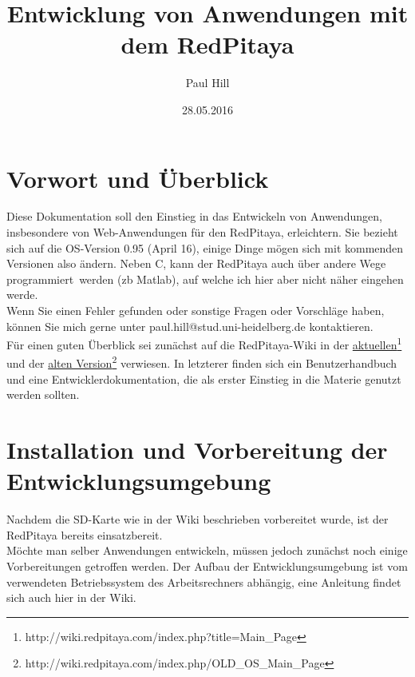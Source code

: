 \documentclass[11pt]{scrartcl}
\begin{document}
\title{Entwicklung von Anwendungen mit dem RedPitaya}
\author{Paul Hill}
\date{28.05.2016}

\maketitle
\tableofcontents
\newpage

\section{Vorwort und Überblick}
Diese Dokumentation soll den Einstieg in das Entwickeln von Anwendungen, insbesondere von Web-Anwendungen für den RedPitaya, erleichtern. Sie bezieht sich auf die OS-Version 0.95 (April 16), einige Dinge mögen sich mit kommenden Versionen also ändern. Neben C, kann der RedPitaya auch über andere Wege \grqq programmiert\grqq~werden (zb Matlab), auf welche ich hier aber nicht näher eingehen werde. \\
Wenn Sie einen Fehler gefunden oder sonstige Fragen oder Vorschläge haben, können Sie mich gerne unter paul.hill@stud.uni-heidelberg.de kontaktieren.\\
 
Für einen guten Überblick sei zunächst auf die RedPitaya-Wiki in der \href{http://wiki.redpitaya.com/index.php?title=Main_Page}{aktuellen\footnote{http://wiki.redpitaya.com/index.php?title=Main\_Page}} und der 
\href{http://wiki.redpitaya.com/index.php/OLD_OS_Main_Page}{alten Version\footnote{http://wiki.redpitaya.com/index.php/OLD\_OS\_Main\_Page}} verwiesen. 
In letzterer finden sich ein Benutzerhandbuch und eine Entwicklerdokumentation, die als erster Einstieg in die Materie genutzt werden sollten.

\section{Installation und Vorbereitung der Entwicklungsumgebung}
Nachdem die SD-Karte wie in der Wiki beschrieben vorbereitet wurde, ist der RedPitaya bereits einsatzbereit. \\
Möchte man selber Anwendungen entwickeln, müssen jedoch zunächst noch einige Vorbereitungen getroffen werden. Der Aufbau der Entwicklungsumgebung ist vom verwendeten Betriebssystem des Arbeitsrechners abhängig, eine Anleitung findet sich auch hier in der Wiki. \\
\end{document}
